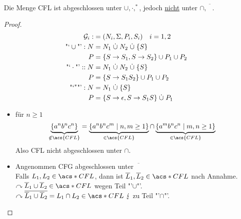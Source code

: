 \begin{Satz} %
	Die Menge \acs{CFL} ist abgeschlossen unter $\cup, \cdot, ^*$, jedoch \underline{nicht} unter $\cap, \overline{\phantom{A}}$.
\end{Satz}
\begin{proof}
	\begin{align*}
		\mathcal{G}_i :&= (N_i, \Sigma,P_i,S_i) \quad i=1,2\\
		\text{"`}\cup\text{"'}: N &= N_1\dotcup N_2\dotcup\{S\}\\
		P &= \{S\->S_1, S\->S_2 \} \cup P_1\cup P_2\\
		\text{"`}\cdot\text{"'}:: N &= N_1\dotcup N_2\dotcup\{S\}\\
		P &= \{ S\->S_1S_2 \} \cup P_1\cup P_2\\
		\text{"`}^*\text{"'}: N &= N_1 \dotcup \{S\}\\
		P &= \{ S\->\epsilon, S\-> S_1S \} \dotcup P_1
	\end{align*}
	\begin{itemize}
	\item für $n\geq 1$
		\[ \underbrace{\{a^nb^nc^n\}}_{\notin \acs{CFL}} = \underbrace{\{a^nb^nc^m \mid n,m\geq 1 \}}_{\in \acs{CFL}} \cap \underbrace{\{a^mb^nc^n \mid m,n\geq 1 \}}_{\in \acs{CFL}} \]
		Also \ac{CFL} nicht abgeschlossen unter $\cap$.
	\item Angenommen \ac{CFG} abgeschlossen unter $\overline{\phantom{X}}$\\
		Falls $L_1,L_2\in \acs*{CFL}$, dann ist $\overline{L}_1,\overline{L}_2\in\acs*{CFL}$ nach Annahme.\\
		$\curvearrowright \overline{L}_1\cup \overline{L}_2\in\acs*{CFL}$ wegen Teil "'$\cup$"'.\\
		$\curvearrowright \overline{\overline{L}_1\cup \overline{L}_2} = L_1\cap L_2\in\acs*{CFL}\ \lightning$ zu Teil "'$\cap$"'. \qedhere
	\end{itemize}
\end{proof}

